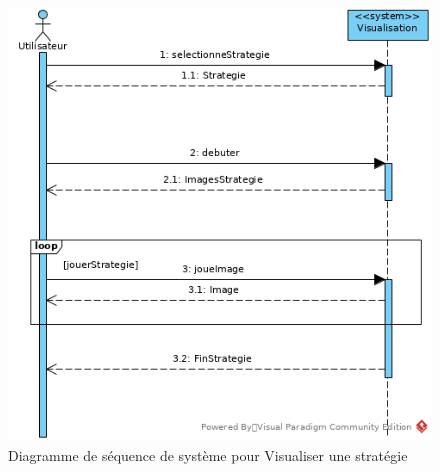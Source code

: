 \begin{figure}[htpb]
    \centering
    \includegraphics[scale=0.5]{fig/ssd_visualiser_strategie.png}
    \caption{Diagramme de séquence de système pour Visualiser une stratégie}
    \label{fig:ssd_visualiser_strategie}
\end{figure}
